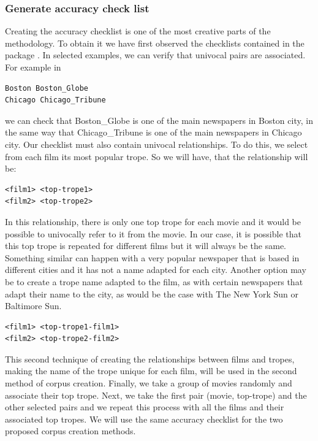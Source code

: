 \documentclass[letterpaper]{article}
\begin{document}
	
 \subsubsection{Generate accuracy check list}
Creating the accuracy checklist is one of the most creative parts of the methodology. To obtain it we have first observed the checklists contained in the package \cite{git-hub-word2vec}. In selected examples, we can verify that univocal pairs are associated. For example in 
\begin{verbatim}
Boston Boston_Globe 
Chicago Chicago_Tribune
\end{verbatim}
we can check that 
Boston\_Globe is one of the main newspapers in Boston city, in the same way that Chicago\_Tribune is one of the main newspapers in Chicago city. Our checklist must also contain univocal relationships. To do this, we select from each film its most popular trope. So we will have, that the relationship will be:

\begin{verbatim}
<film1> <top-trope1> 
<film2> <top-trope2>
\end{verbatim}

In this relationship, there is only one top trope for each movie and it would be possible to univocally refer to it from the movie. In our case, it is possible that this top trope is repeated for different films but it will always be the same. Something similar can happen with a very popular newspaper that is based in different cities and it has not a name adapted for each city. Another option may be to create a trope name adapted to the film, as with certain newspapers that adapt their name to the city, as would be the case with The New York Sun or Baltimore Sun. 
\begin{verbatim}
<film1> <top-trope1-film1> 
<film2> <top-trope2-film2>
\end{verbatim}
	
 This second technique of creating the relationships between films and tropes, making the name of the trope unique for each film, will be used in the second method of corpus creation. Finally, we take a group of movies randomly and associate their top trope. Next, we take the first pair (movie, top-trope) and the other selected pairs and we repeat this process with all the films and their associated top tropes. We will use the same accuracy checklist for the two proposed corpus creation methods.   
\end{document}
